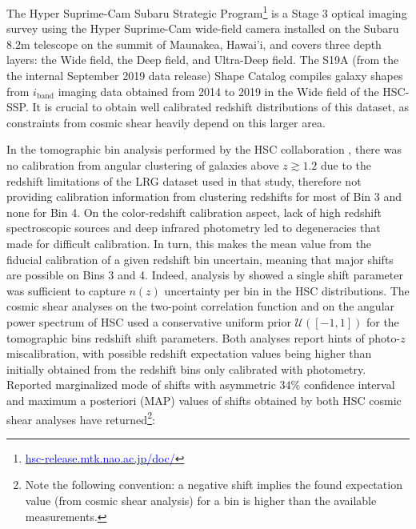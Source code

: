 The Hyper Suprime-Cam Subaru Strategic Program\footnote{\href{https://hsc-release.mtk.nao.ac.jp/doc/}{\textcolor{blue}{hsc-release.mtk.nao.ac.jp/doc/}}}\cite{HSCOverviewAihara2017} is a Stage 3 optical imaging survey using the Hyper Suprime-Cam wide-field  camera installed on the Subaru $8.2$m telescope on the summit of Maunakea, Hawai'i, and covers three depth layers: the Wide field, the Deep field, and Ultra-Deep field. The S19A (from the the internal September 2019 data release) Shape Catalog \cite{HSCShapeCataloguePDR3Li2022} compiles galaxy shapes from $i_{\mathrm{band}}$ imaging data obtained from 2014 to 2019 in the Wide field of the HSC-SSP. It is crucial to obtain well calibrated redshift distributions of this dataset, as constraints from cosmic shear heavily depend on this larger area.

In the tomographic bin analysis performed by the HSC collaboration \cite{HSCClusteringRau2023}, there was no calibration from angular clustering of galaxies above $z\gtrsim1.2$ due to the redshift limitations of the LRG dataset used in that study, therefore not providing calibration information from clustering redshifts for most of Bin 3 and none for Bin 4. 
On the color-redshift calibration aspect, lack of high redshift spectroscopic sources and deep infrared photometry led to degeneracies that made for difficult calibration.
In turn, this makes the mean value from the fiducial calibration of a given redshift bin uncertain, meaning that major shifts are possible on Bins 3 and 4.
Indeed, analysis by \cite{Zhang2022PhotometricRedshiftShifts} showed a single shift parameter was sufficient to capture $n(z)$ uncertainty per bin in the HSC distributions.
The cosmic shear analyses on the two-point correlation function \cite{CosmoShearLi2023HSCY3} and on the angular power spectrum \cite{Dalal2023CosmoShearHSC} of HSC used a conservative uniform prior $\mathcal{U}([-1,1])$ for the tomographic bins redshift shift parameters.
Both analyses report hints of photo-$z$ miscalibration, with possible redshift expectation values being higher than initially obtained from the redshift bins only calibrated with photometry. Reported marginalized mode of shifts with asymmetric $34\%$ confidence interval and maximum a posteriori (MAP) values of shifts obtained by both HSC cosmic shear analyses have returned\footnote{Note the following convention: a negative shift implies the found expectation value (from cosmic shear analysis) for a bin is higher than the available measurements.}: %
